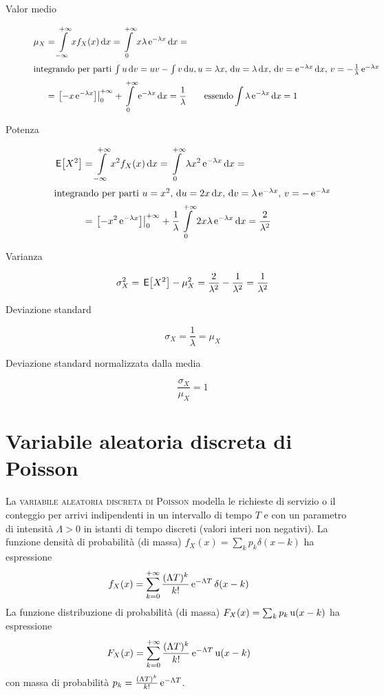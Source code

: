 \begin{description}
\item[Valor medio]
\begin{equation}\begin{split}\mu_X&=\intinf{x f_X(x)}{x}=\intd{0}{+\infty}{x \lambda\e{-\lambda x}}{x}=\\
\intertext{integrando per parti $\int{u \diff v}=u v-\int{v\diff u}, u=\lambda x$, $\diff u=\lambda\diff x$, $\diff v=\e{-\lambda x}\diff x$, $v=-\frac{1}{\lambda}\e{-\lambda x}$}
&=\bound{0}{+\infty}{-x\e{-\lambda x}}+\intd{0}{+\infty}{\e{-\lambda x}}{x}=\frac{1}{\lambda} 	\qquad\text{essendo} \int\lambda\e{-\lambda x}\diff x=1\end{split}\end{equation}
\item[Potenza]
\begin{equation}\begin{split}
\E{X^2}&=\intinf{x^2 f_X(x)}{x}=\intd{0}{+\infty}{\lambda x^2\e{-\lambda x}}{x}=\\
\intertext{integrando per parti $u=x^2$, $\diff u=2x\diff x$, $\diff v=\lambda\e{-\lambda x}$, $v=-\e{-\lambda x}$}
&=\bound{0}{+\infty}{-x^2\e{-\lambda x}}+\frac{1}{\lambda}\intd{0}{+\infty}{2x \lambda\e{-\lambda x}}{x}=\frac{2}{\lambda^2}
\end{split}\end{equation}
\item[Varianza]
\[\sigma^2_X=\E{X^2}-\mu^2_X=\frac{2}{\lambda^2}-\frac{1}{\lambda^2}=\frac{1}{\lambda^2}\]
\item[Deviazione standard]
\[\sigma_X=\frac{1}{\lambda}=\mu_X\]
\item[Deviazione standard normalizzata dalla media] \[\frac{\sigma_X}{\mu_X}=1\]
\end{description}

\section{Variabile aleatoria discreta di Poisson}
La \textsc{variabile aleatoria discreta di Poisson} modella le richieste di servizio o il conteggio per arrivi indipendenti in un intervallo di tempo $T$ e con un parametro di intensità $\Lambda>0$ in istanti di tempo discreti (valori interi non negativi). La funzione densità di probabilità (di massa) $f_X(x)=\sum_k p_k \delta(x-k)$ ha espressione
\begin{equation}
f_X(x)=\sum_{k=0}^{+\infty}{\frac{(\Lambda T)^k}{k!}\e{-\Lambda T}\delta(x-k)}
\end{equation}
La funzione distribuzione di probabilità (di massa) $F_X(x)=\sum_k p_k \step(x-k)$ ha espressione
\begin{equation}
F_X(x)=\sum_{k=0}^{+\infty}{\frac{(\Lambda T)^k}{k!}\e{-\Lambda T}\step(x-k)}
\end{equation}
con massa di probabilità $p_k=\frac{(\Lambda T)^k}{k!}\e{-\Lambda T}$.

